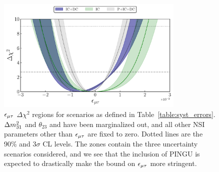 {\begin{figure}
   \begin{center} 
      \includegraphics[width=0.8\textwidth]{figures/PID_3D_emt.pdf}
      \caption{$\epsilon_{\mu\tau}$ $\Delta \chi^2$ regions for scenarios as defined in Table~\ref{table:syst_errors}.
    $\dm[31]$ and $\theta_{23}$ and have been marginalized out, and all other NSI 
    parameters other than $\epsilon_{\mu\tau}$ are fixed to zero. Dotted lines are the 90\% and $3\sigma$ CL levels.
    The zones contain the three uncertainty scenarios considered, and we see that the inclusion of PINGU is expected 
    to drastically make the bound on $\epsilon_{\mu\tau}$ more stringent.
    }\label{fig:IC_3D}
   \end{center}
\end{figure}

}
